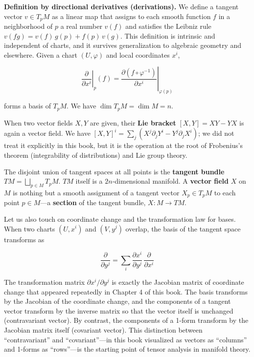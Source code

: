 \textbf{Definition by directional derivatives (derivations).} We define
a tangent vector \(v \in T_p M\) as a linear map that assigns to each
smooth function \(f\) in a neighborhood of \(p\) a real number \(v(f)\)
and satisfies the Leibniz rule \(v(fg) = v(f)\,g(p) + f(p)\,v(g)\). This
definition is intrinsic and independent of charts, and it survives
generalization to algebraic geometry and elsewhere. Given a chart
\((U, \varphi)\) and local coordinates \(x^i\),

\[\left.\frac{\partial}{\partial x^i}\right|_p (f) = \left.\frac{\partial (f \circ \varphi^{-1})}{\partial x^i}\right|_{\varphi(p)}\]

forms a basis of \(T_p M\). We have \(\dim T_p M = \dim M = n\).

When two vector fields \(X, Y\) are given, their \textbf{Lie bracket}
\([X, Y] = XY - YX\) is again a vector field. We have
\([X,Y]^i = \sum_j (X^j \partial_j Y^i - Y^j \partial_j X^i)\); we did
not treat it explicitly in this book, but it is the operation at the
root of Frobenius's theorem (integrability of distributions) and Lie
group theory.

The disjoint union of tangent spaces at all points is the
\textbf{tangent bundle} \(TM = \bigsqcup_{p \in M} T_p M\). \(TM\)
itself is a \(2n\)-dimensional manifold. A \textbf{vector field} \(X\)
on \(M\) is nothing but a smooth assignment of a tangent vector
\(X_p \in T_p M\) to each point \(p \in M\)---a \textbf{section} of the
tangent bundle, \(X: M \to TM\).

Let us also touch on coordinate change and the transformation law for
bases. When two charts \((U, x^i)\) and \((V, y^j)\) overlap, the basis
of the tangent space transforms as

\[\frac{\partial}{\partial y^j} = \sum_i \frac{\partial x^i}{\partial y^j}\,\frac{\partial}{\partial x^i}\]

The transformation matrix \(\partial x^i/\partial y^j\) is exactly the
Jacobian matrix of coordinate change that appeared repeatedly in Chapter
4 of this book. The basis transforms by the Jacobian of the coordinate
change, and the components of a tangent vector transform by the inverse
matrix so that the vector itself is unchanged (contravariant vector). By
contrast, the components of a 1-form transform by the Jacobian matrix
itself (covariant vector). This distinction between ``contravariant''
and ``covariant''---in this book visualized as vectors as ``columns''
and 1-forms as ``rows''---is the starting point of tensor analysis in
manifold theory.

